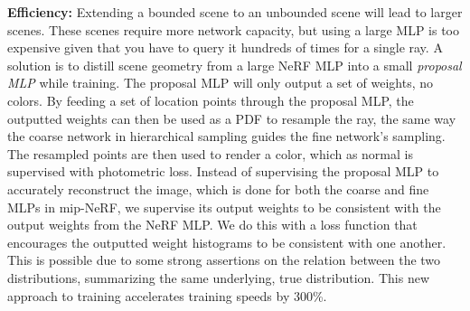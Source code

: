 \textbf{Efficiency:}
Extending a bounded scene to an unbounded scene will lead to larger scenes. These scenes require more network capacity, but using a large MLP is too expensive given that you have to query it hundreds of times for a single ray. A solution is to distill scene geometry from a large NeRF MLP into a small \textit{proposal MLP} while training. The proposal MLP will only output a set of weights, no colors. By feeding a set of location points through the proposal MLP, the outputted weights can then be used as a PDF to resample the ray, the same way the coarse network in hierarchical sampling guides the fine network's sampling. The resampled points are then used to render a color, which as normal is supervised with photometric loss. Instead of supervising the proposal MLP to accurately reconstruct the image, which is done for both the coarse and fine MLPs in mip-NeRF, we supervise its output weights to be consistent with the output weights from the NeRF MLP. We do this with a loss function that encourages the outputted weight histograms to be consistent with one another. This is possible due to some strong assertions on the relation between the two distributions, summarizing the same underlying, true distribution. This new approach to training accelerates training speeds by 300\%.




